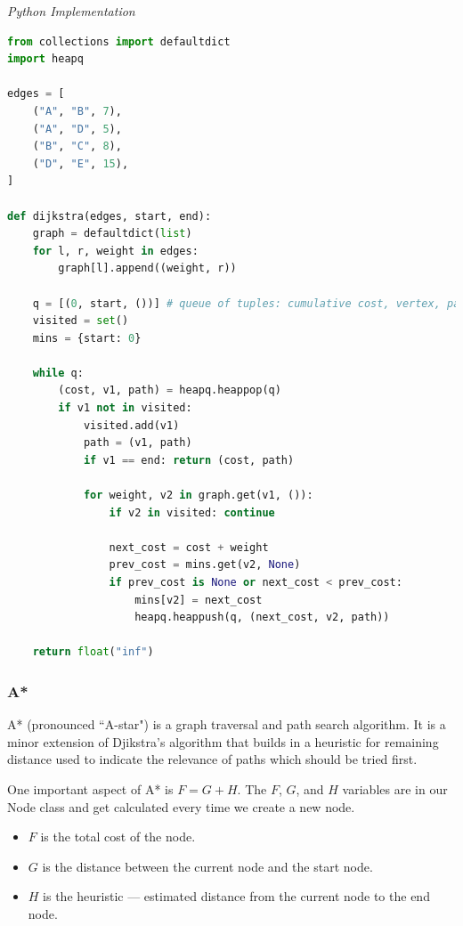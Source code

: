 \documentclass{article}
\begin{document}
\vspace{8pt} \emph{Python Implementation}
\begin{lstlisting}[language=Python]
from collections import defaultdict
import heapq 

edges = [
    ("A", "B", 7),
    ("A", "D", 5),
    ("B", "C", 8),
    ("D", "E", 15),
]

def dijkstra(edges, start, end):
    graph = defaultdict(list)
    for l, r, weight in edges:
        graph[l].append((weight, r))

    q = [(0, start, ())] # queue of tuples: cumulative cost, vertex, path
    visited = set()
    mins = {start: 0}
    
    while q:
        (cost, v1, path) = heapq.heappop(q)
        if v1 not in visited:
            visited.add(v1)
            path = (v1, path)
            if v1 == end: return (cost, path)

            for weight, v2 in graph.get(v1, ()):
                if v2 in visited: continue
                
                next_cost = cost + weight
                prev_cost = mins.get(v2, None)
                if prev_cost is None or next_cost < prev_cost:
                    mins[v2] = next_cost
                    heapq.heappush(q, (next_cost, v2, path))

    return float("inf")
\end{lstlisting}

    \subsubsection{A*}
    A* (pronounced ``A-star") is a graph traversal and path search algorithm. It is a minor extension of Djikstra's algorithm that builds in a heuristic for remaining distance used to indicate the relevance of paths which should be tried first.
    
    One important aspect of A* is $F = G + H$. The $F$, $G$, and $H$ variables are in our Node class and get calculated every time we create a new node. 
    \begin{itemize}
        \item $F$ is the total cost of the node.
        \item $G$ is the distance between the current node and the start node.
        \item $H$ is the heuristic — estimated distance from the current node to the end node.
    \end{itemize}
    
\end{document}
